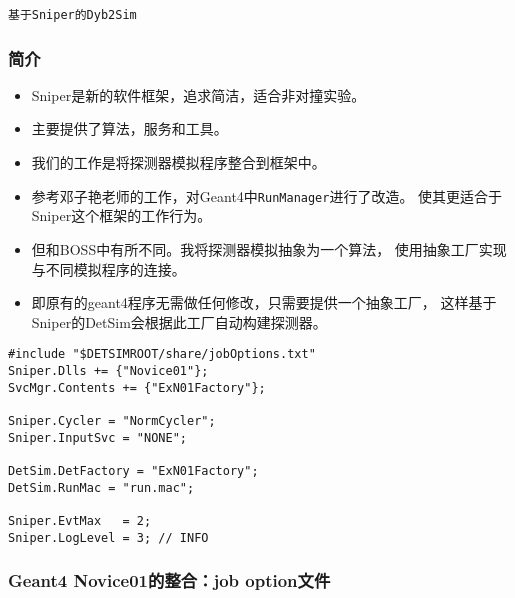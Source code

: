 \begin{frame}
    \begin{center}
        \LARGE \tt{基于Sniper的Dyb2Sim}
    \end{center}
\end{frame}


\begin{frame}
    \frametitle{简介}
    \begin{itemize}    
        \item Sniper是新的软件框架，追求简洁，适合非对撞实验。
        \item 主要提供了算法，服务和工具。
        \item 我们的工作是将探测器模拟程序整合到框架中。
        \item 参考邓子艳老师的工作，对Geant4中{\tt RunManager}进行了改造。
              使其更适合于Sniper这个框架的工作行为。
        \item 但和BOSS中有所不同。我将探测器模拟抽象为一个算法，
              使用抽象工厂实现与不同模拟程序的连接。
        \item 即原有的geant4程序无需做任何修改，只需要提供一个抽象工厂，
              这样基于Sniper的DetSim会根据此工厂自动构建探测器。
    \end{itemize}
\end{frame}

\newsavebox{\NoviceJobOptions}
\begin{lrbox}{\NoviceJobOptions}
\begin{lstlisting}
#include "$DETSIMROOT/share/jobOptions.txt"
Sniper.Dlls += {"Novice01"};
SvcMgr.Contents += {"ExN01Factory"};

Sniper.Cycler = "NormCycler";
Sniper.InputSvc = "NONE";

DetSim.DetFactory = "ExN01Factory";
DetSim.RunMac = "run.mac";

Sniper.EvtMax   = 2;
Sniper.LogLevel = 3; // INFO
\end{lstlisting}
\end{lrbox}

\begin{frame}
    \frametitle{Geant4 Novice01的整合：job option文件}
    \par\usebox{\NoviceJobOptions}
\end{frame}

